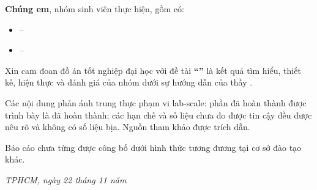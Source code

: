 \begin{declaration}
\setlength{\parskip}{6pt}

\textbf{Chúng em}, nhóm sinh viên thực hiện, gồm có:
\begin{itemize}
    \item [1.] \studentname{} -- \mssv
    \item [2.] \studentnametwo{} -- \mssvtwo
\end{itemize}

Xin cam đoan đồ án tốt nghiệp đại học với đề tài \textbf{``\titlethesis''} là kết quả tìm hiểu, thiết kế, hiện thực và đánh giá của nhóm dưới sự hướng dẫn của thầy \textbf{\supervisor}.

Các nội dung phản ánh trung thực phạm vi lab-scale: phần đã hoàn thành được trình bày là đã hoàn thành; các hạn chế và số liệu chưa đo được tin cậy đều được nêu rõ và không có số liệu bịa. Nguồn tham khảo được trích dẫn.

Báo cáo chưa từng được công bố dưới hình thức tương đương tại cơ sở đào tạo khác.

\vspace{1.5cm}
\begin{flushright}
    \textit{TPHCM, ngày 22 tháng 11 năm \yearsubmit} \\
     \\
     \\[1.4cm]
    \makebox[8cm][c]{\textbf{\studentname} --- \textbf{\studentnametwo}}\\
\end{flushright}
\end{declaration}
